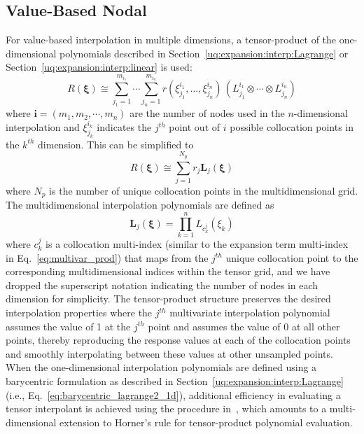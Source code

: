 \subsection{Value-Based Nodal} \label{uq:expansion:sc:value}

For value-based interpolation in multiple dimensions, a tensor-product
of the one-dimensional polynomials described in
Section~\ref{uq:expansion:interp:Lagrange} or
Section~\ref{uq:expansion:interp:linear} is used:
\begin{equation}
R(\boldsymbol{\xi}) \cong \sum_{j_1=1}^{m_{i_1}}\cdots\sum_{j_n=1}^{m_{i_n}}
r\left(\xi^{i_1}_{j_1},\dots , \xi^{i_n}_{j_n}\right)\,
\left(L^{i_1}_{j_1}\otimes\cdots\otimes L^{i_n}_{j_n}\right)
\label{eq:lagrange_tensor}
\end{equation}
where $\boldsymbol{i} = (m_1, m_2, \cdots, m_n)$ are the number of
nodes used in the $n$-dimensional interpolation and $\xi_{j_k}^{i_k}$ 
indicates the $j^{th}$ point out of $i$ possible collocation points 
in the $k^{th}$ dimension.  This can be simplified to
\begin{equation}
R(\boldsymbol{\xi}) \cong \sum_{j=1}^{N_p} r_j \boldsymbol{L}_j(\boldsymbol{\xi})
\label{eq:lagrange_interp_nd}
\end{equation}
where $N_p$ is the number of unique collocation points in the
multidimensional grid.  The multidimensional interpolation polynomials
are defined as
\begin{equation}
\boldsymbol{L}_j(\boldsymbol{\xi}) = \prod_{k=1}^{n} L_{c_k^j}(\xi_k) 
\label{eq:multivar_L}
\end{equation}
where $c_k^j$ is a collocation multi-index (similar to the expansion
term multi-index in Eq.~\ref{eq:multivar_prod}) that maps from the
$j^{th}$ unique collocation point to the corresponding
multidimensional indices within the tensor grid, and we have dropped
the superscript notation indicating the number of nodes in each
dimension for simplicity.  The tensor-product structure preserves the
desired interpolation properties where the $j^{th}$ multivariate
interpolation polynomial assumes the value of 1 at the $j^{th}$ point
and assumes the value of 0 at all other points, thereby reproducing
the response values at each of the collocation points and smoothly
interpolating between these values at other unsampled points.  When
the one-dimensional interpolation polynomials are defined using a
barycentric formulation as described in
Section~\ref{uq:expansion:interp:Lagrange} (i.e., 
Eq.~\ref{eq:barycentric_lagrange2_1d}), additional efficiency in
evaluating a tensor interpolant is achieved using the procedure
in~\cite{Klimke05}, which amounts to a multi-dimensional extension to
Horner's rule for tensor-product polynomial evaluation.

